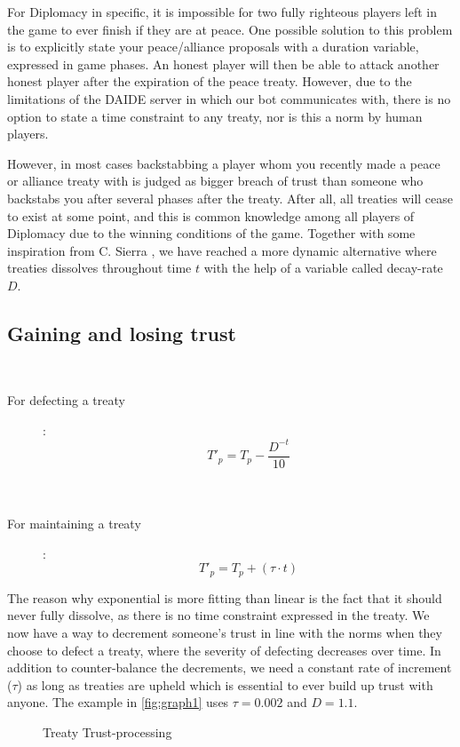 \documentclass[a4paper]{article} %
\begin{document}
For Diplomacy in specific, it is impossible for two fully righteous players left in the game to ever finish if they are at peace. One possible solution to this problem is to explicitly state your peace/alliance proposals with a duration variable, expressed in game phases. An honest player will then be able to attack another honest player after the expiration of the peace treaty. However, due to the limitations of the DAIDE server in which our bot communicates with, there is no option to state a time constraint to any treaty, nor is this a norm by human players.

However, in most cases backstabbing a player whom you recently made a peace or alliance treaty with is judged as bigger breach of trust than someone who backstabs you after several phases after the treaty. After all, all treaties will cease to exist at some point, and this is common knowledge among all players of Diplomacy due to the winning conditions of the game. Together with some inspiration from C. Sierra \cite{trust}, we have reached a more dynamic alternative where treaties dissolves throughout time $t$ with the help of a variable called decay-rate $D$.

\subsection{Gaining and losing trust}
\
\begin{description}
\item[For defecting a treaty]: 
$$T'_p = T_p - \frac{D^{-t}} {10}$$ \\
\
\item[For maintaining a treaty]: 
$$T'_p = T_p + (\tau \cdot t)$$
\end{description}

The reason why exponential is more fitting than linear is the fact that it should never fully dissolve, as there is no time constraint expressed in the treaty. We now have a way to decrement someone's trust in line with the norms when they choose to defect a treaty, where the severity of defecting decreases over time. In addition to counter-balance the decrements, we need a constant rate of increment ($\tau$) as long as treaties are upheld which is essential to ever build up trust with anyone. The example in \autoref{fig:graph1} uses $\tau = 0.002$ and $D = 1.1$.

\begin{figure}[H]
\centering
{}
\caption{Treaty Trust-processing}
\label{fig:graph1}
\end{figure}
\end{document}
